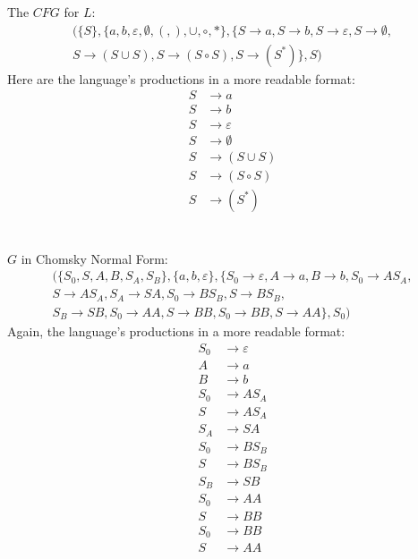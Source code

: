 \documentclass{article}
\begin{document}
\section{} %
The $CFG$ for $L$:
\begin{align*}
	(\{S\},\{a,b,\varepsilon,\emptyset,(,),\cup,\circ,*\},
	\{S\rightarrow a,S\rightarrow b,S\rightarrow\varepsilon,S\rightarrow\emptyset,\\
	S\rightarrow(S\cup S),S\rightarrow(S\circ S),S\rightarrow(S^*)\},S)
\end{align*}
Here are the language's productions in a more readable format:
\begin{align*}
	S&\rightarrow a\\
	S&\rightarrow b\\
	S&\rightarrow\varepsilon\\
	S&\rightarrow\emptyset\\
	S&\rightarrow(S\cup S)\\
	S&\rightarrow(S\circ S)\\
	S&\rightarrow(S^*)
\end{align*}
\section{} %
\subsection{} %
$G$ in Chomsky Normal Form:
\begin{align*}
	(\{S_0,S,A,B,S_A,S_B\},\{a,b,\varepsilon\},
	\{S_0\rightarrow\varepsilon,A\rightarrow a,B\rightarrow b,S_0\rightarrow AS_A,\\
	S\rightarrow AS_A,S_A\rightarrow SA,S_0\rightarrow BS_B,S\rightarrow BS_B,\\
	S_B\rightarrow SB,S_0\rightarrow AA,S\rightarrow BB,S_0\rightarrow BB, S\rightarrow AA\},S_0)
\end{align*}
Again, the language's productions in a more readable format:
\begin{align*}
	S_0&\rightarrow\varepsilon\\
	A&\rightarrow a\\
	B&\rightarrow b\\
	S_0&\rightarrow AS_A\\
	S&\rightarrow AS_A\\
	S_A&\rightarrow SA\\
	S_0&\rightarrow BS_B\\
	S&\rightarrow BS_B\\
	S_B&\rightarrow SB\\
	S_0&\rightarrow AA\\
	S&\rightarrow BB\\
	S_0&\rightarrow BB\\
	S&\rightarrow AA\\
\end{align*}
\end{document}
